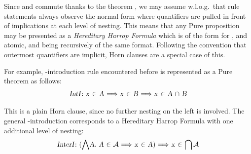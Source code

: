 \begin{isabellebody}
\begin{isamarkuptext}
  Since \isa{{\isachardoublequote}{\isasymAnd}{\isachardoublequote}} and \isa{{\isachardoublequote}{\isasymLongrightarrow}{\isachardoublequote}} commute thanks to the theorem
  , we may assume w.l.o.g.\
  that rule statements always observe the normal form where
  quantifiers are pulled in front of implications at each level of
  nesting.  This means that any Pure proposition may be presented as a
  \emph{Hereditary Harrop Formula} \cite{Miller:1991} which is of the
  form  for , and  atomic, and  being recursively of the same format.
  Following the convention that outermost quantifiers are implicit,
  Horn clauses  are a special
  case of this.

  For example, \isa{{\isachardoublequote}{\isasyminter}{\isachardoublequote}}-introduction rule encountered before is
  represented as a Pure theorem as follows:
  \[
  \isa{{\isachardoublequote}IntI{\isacharcolon}{\isachardoublequote}}~\isa{{\isachardoublequote}x\ {\isasymin}\ A\ {\isasymLongrightarrow}\ x\ {\isasymin}\ B\ {\isasymLongrightarrow}\ x\ {\isasymin}\ A\ {\isasyminter}\ B{\isachardoublequote}}
  \]

  \noindent This is a plain Horn clause, since no further nesting on
  the left is involved.  The general \isa{{\isachardoublequote}{\isasymInter}{\isachardoublequote}}-introduction
  corresponds to a Hereditary Harrop Formula with one additional level
  of nesting:
  \[
  \isa{{\isachardoublequote}InterI{\isacharcolon}{\isachardoublequote}}~\isa{{\isachardoublequote}{\isacharparenleft}{\isasymAnd}A{\isachardot}\ A\ {\isasymin}\ {\isasymA}\ {\isasymLongrightarrow}\ x\ {\isasymin}\ A{\isacharparenright}\ {\isasymLongrightarrow}\ x\ {\isasymin}\ {\isasymInter}{\isasymA}{\isachardoublequote}}
  \]


\end{isamarkuptext}
\end{isabellebody}
